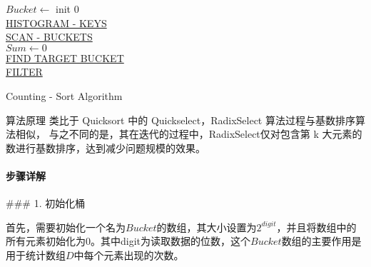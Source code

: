 \begin{algorithm}
    \SetAlgoLined
    $Bucket \leftarrow$ init $0$ \\ 
    \underline{HISTOGRAM - KEYS}\\
    \underline{SCAN - BUCKETS}\\
    $Sum \leftarrow 0$\\
    \underline{FIND TARGET BUCKET}\\
    \underline{FILTER}\\
    \caption{Counting - Sort Algorithm}
    \label{alg:Counting}
  \end{algorithm}
  
  算法原理
  类比于 Quicksort 中的 Quickselect，RadixSelect 算法过程与基数排序算法相似，
  与之不同的是，其在迭代的过程中，RadixSelect仅对包含第 k 大元素的数进行基数排序，达到减少问题规模的效果。
 
  \paragraph{步骤详解}

 ### 1. 初始化桶

  首先，需要初始化一个名为\(Bucket\)的数组，其大小设置为\(2^{digit}\)，并且将数组中的所有元素初始化为\(0\)。其中digit为读取数据的位数，这个\(Bucket\)数组的主要作用是用于统计数组\(D\)中每个元素出现的次数。
  
